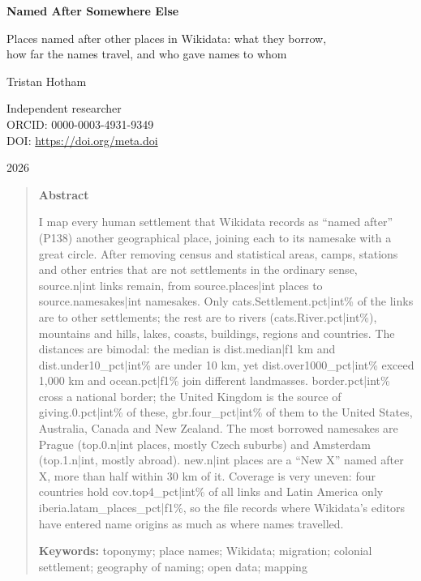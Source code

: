\documentclass[11pt,a4paper]{article}
\begin{document}
\begin{center}
{\Large\bfseries Named After Somewhere Else\par}
\vspace{0.4em}
{\large Places named after other places in Wikidata: what they borrow,\\how far the names travel, and who gave names to whom\par}
\vspace{1.2em}
{\large Tristan Hotham\par}
\vspace{0.3em}
{\small Independent researcher\\
ORCID: 0000-0003-4931-9349\\
DOI: \href{https://doi.org/{{meta.doi}}}{https://doi.org/{{meta.doi}}}\par}
\vspace{0.8em}
2026
\end{center}

\begin{quote}
\small
\begin{center}\textbf{Abstract}\end{center}
I map every human settlement that Wikidata records as ``named after'' (P138) another geographical place, joining each to its namesake with a great circle. After removing census and statistical areas, camps, stations and other entries that are not settlements in the ordinary sense, {{source.n|int}} links remain, from {{source.places|int}} places to {{source.namesakes|int}} namesakes. Only {{cats.Settlement.pct|int}}\% of the links are to other settlements; the rest are to rivers ({{cats.River.pct|int}}\%), mountains and hills, lakes, coasts, buildings, regions and countries. The distances are bimodal: the median is {{dist.median|f1}} km and {{dist.under10_pct|int}}\% are under 10 km, yet {{dist.over1000_pct|int}}\% exceed 1,000 km and {{ocean.pct|f1}}\% join different landmasses. {{border.pct|int}}\% cross a national border; the United Kingdom is the source of {{giving.0.pct|int}}\% of these, {{gbr.four_pct|int}}\% of them to the United States, Australia, Canada and New Zealand. The most borrowed namesakes are Prague ({{top.0.n|int}} places, mostly Czech suburbs) and Amsterdam ({{top.1.n|int}}, mostly abroad). {{new.n|int}} places are a ``New X'' named after X, more than half within 30 km of it. Coverage is very uneven: four countries hold {{cov.top4_pct|int}}\% of all links and Latin America only {{iberia.latam_places_pct|f1}}\%, so the file records where Wikidata's editors have entered name origins as much as where names travelled.

\textbf{Keywords:} toponymy; place names; Wikidata; migration; colonial settlement; geography of naming; open data; mapping
\end{quote}
\end{document}
